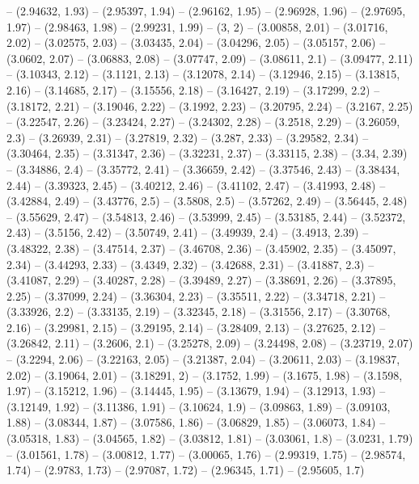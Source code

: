 -- (2.94632, 1.93)
-- (2.95397, 1.94)
-- (2.96162, 1.95)
-- (2.96928, 1.96)
-- (2.97695, 1.97)
-- (2.98463, 1.98)
-- (2.99231, 1.99)
-- (3, 2)
-- (3.00858, 2.01)
-- (3.01716, 2.02)
-- (3.02575, 2.03)
-- (3.03435, 2.04)
-- (3.04296, 2.05)
-- (3.05157, 2.06)
-- (3.0602, 2.07)
-- (3.06883, 2.08)
-- (3.07747, 2.09)
-- (3.08611, 2.1)
-- (3.09477, 2.11)
-- (3.10343, 2.12)
-- (3.1121, 2.13)
-- (3.12078, 2.14)
-- (3.12946, 2.15)
-- (3.13815, 2.16)
-- (3.14685, 2.17)
-- (3.15556, 2.18)
-- (3.16427, 2.19)
-- (3.17299, 2.2)
-- (3.18172, 2.21)
-- (3.19046, 2.22)
-- (3.1992, 2.23)
-- (3.20795, 2.24)
-- (3.2167, 2.25)
-- (3.22547, 2.26)
-- (3.23424, 2.27)
-- (3.24302, 2.28)
-- (3.2518, 2.29)
-- (3.26059, 2.3)
-- (3.26939, 2.31)
-- (3.27819, 2.32)
-- (3.287, 2.33)
-- (3.29582, 2.34)
-- (3.30464, 2.35)
-- (3.31347, 2.36)
-- (3.32231, 2.37)
-- (3.33115, 2.38)
-- (3.34, 2.39)
-- (3.34886, 2.4)
-- (3.35772, 2.41)
-- (3.36659, 2.42)
-- (3.37546, 2.43)
-- (3.38434, 2.44)
-- (3.39323, 2.45)
-- (3.40212, 2.46)
-- (3.41102, 2.47)
-- (3.41993, 2.48)
-- (3.42884, 2.49)
-- (3.43776, 2.5)
-- (3.5808, 2.5)
-- (3.57262, 2.49)
-- (3.56445, 2.48)
-- (3.55629, 2.47)
-- (3.54813, 2.46)
-- (3.53999, 2.45)
-- (3.53185, 2.44)
-- (3.52372, 2.43)
-- (3.5156, 2.42)
-- (3.50749, 2.41)
-- (3.49939, 2.4)
-- (3.4913, 2.39)
-- (3.48322, 2.38)
-- (3.47514, 2.37)
-- (3.46708, 2.36)
-- (3.45902, 2.35)
-- (3.45097, 2.34)
-- (3.44293, 2.33)
-- (3.4349, 2.32)
-- (3.42688, 2.31)
-- (3.41887, 2.3)
-- (3.41087, 2.29)
-- (3.40287, 2.28)
-- (3.39489, 2.27)
-- (3.38691, 2.26)
-- (3.37895, 2.25)
-- (3.37099, 2.24)
-- (3.36304, 2.23)
-- (3.35511, 2.22)
-- (3.34718, 2.21)
-- (3.33926, 2.2)
-- (3.33135, 2.19)
-- (3.32345, 2.18)
-- (3.31556, 2.17)
-- (3.30768, 2.16)
-- (3.29981, 2.15)
-- (3.29195, 2.14)
-- (3.28409, 2.13)
-- (3.27625, 2.12)
-- (3.26842, 2.11)
-- (3.2606, 2.1)
-- (3.25278, 2.09)
-- (3.24498, 2.08)
-- (3.23719, 2.07)
-- (3.2294, 2.06)
-- (3.22163, 2.05)
-- (3.21387, 2.04)
-- (3.20611, 2.03)
-- (3.19837, 2.02)
-- (3.19064, 2.01)
-- (3.18291, 2)
-- (3.1752, 1.99)
-- (3.1675, 1.98)
-- (3.1598, 1.97)
-- (3.15212, 1.96)
-- (3.14445, 1.95)
-- (3.13679, 1.94)
-- (3.12913, 1.93)
-- (3.12149, 1.92)
-- (3.11386, 1.91)
-- (3.10624, 1.9)
-- (3.09863, 1.89)
-- (3.09103, 1.88)
-- (3.08344, 1.87)
-- (3.07586, 1.86)
-- (3.06829, 1.85)
-- (3.06073, 1.84)
-- (3.05318, 1.83)
-- (3.04565, 1.82)
-- (3.03812, 1.81)
-- (3.03061, 1.8)
-- (3.0231, 1.79)
-- (3.01561, 1.78)
-- (3.00812, 1.77)
-- (3.00065, 1.76)
-- (2.99319, 1.75)
-- (2.98574, 1.74)
-- (2.9783, 1.73)
-- (2.97087, 1.72)
-- (2.96345, 1.71)
-- (2.95605, 1.7)
